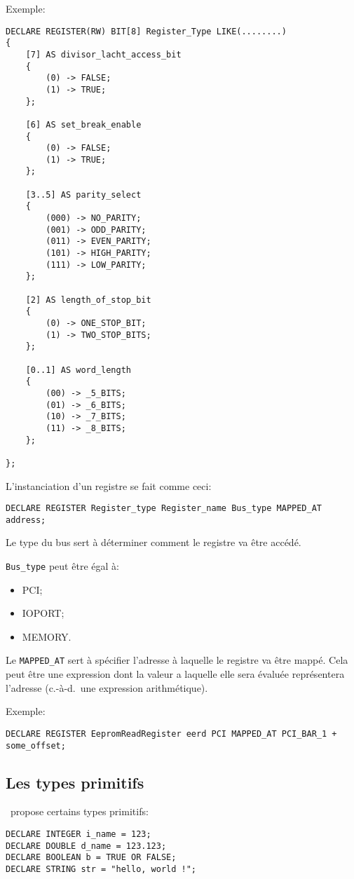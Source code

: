 \documentclass{rtxreport}
\begin{document}
Exemple:
\begin{lstlisting}[caption=Exemple de description interne du registre]
DECLARE REGISTER(RW) BIT[8] Register_Type LIKE(........)
{
    [7] AS divisor_lacht_access_bit
    {
        (0) -> FALSE;
        (1) -> TRUE;
    };

    [6] AS set_break_enable
    {
        (0) -> FALSE;
        (1) -> TRUE;
    };

    [3..5] AS parity_select
    {
        (000) -> NO_PARITY;
        (001) -> ODD_PARITY;
        (011) -> EVEN_PARITY;
        (101) -> HIGH_PARITY;
        (111) -> LOW_PARITY;
    };

    [2] AS length_of_stop_bit
    {
        (0) -> ONE_STOP_BIT;
        (1) -> TWO_STOP_BITS;
    };

    [0..1] AS word_length
    {
        (00) -> _5_BITS;
        (01) -> _6_BITS;
        (10) -> _7_BITS;
        (11) -> _8_BITS;
    };

};
\end{lstlisting}


L'instanciation d'un registre se fait comme ceci:
\begin{lstlisting}[caption=Instanciation d'un registre]
DECLARE REGISTER Register_type Register_name Bus_type MAPPED_AT address;
\end{lstlisting}

Le type du bus sert à déterminer comment le registre va être accédé.

\texttt{Bus\_type} peut être égal à:
\begin{itemize}
	\item PCI;
	\item IOPORT;
	\item MEMORY.
\end{itemize}

Le \texttt{MAPPED\_AT} sert à spécifier l'adresse à laquelle le registre va être mappé.
Cela peut être une expression dont la valeur a laquelle elle sera évaluée représentera l'adresse (c.-à-d.\ une expression
arithmétique).


Exemple:
\begin{lstlisting}[caption=Exemple d'instanciation de registre]
DECLARE REGISTER EepromReadRegister eerd PCI MAPPED_AT PCI_BAR_1 + some_offset;
\end{lstlisting}

\subsection{Les types primitifs}
\rtx\  propose certains types primitifs:
\begin{lstlisting}[caption=Les types primitifs]
DECLARE INTEGER i_name = 123;
DECLARE DOUBLE d_name = 123.123;
DECLARE BOOLEAN b = TRUE OR FALSE;
DECLARE STRING str = "hello, world !";
\end{lstlisting}
\end{document}
